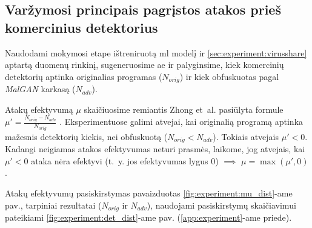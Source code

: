 \clearpage
\subsection{Varžymosi principais pagrįstos atakos prieš komercinius detektorius}

Naudodami mokymosi etape ištreniruotą \acs{ml} modelį ir
\ref{sec:experiment:virusshare} aptartą duomenų rinkinį, sugeneruosime \acs{ae}
ir palyginsime, kiek komercinių detektorių aptinka originalias programas
($N_{orig}$) ir kiek obfuskuotas pagal \textit{MalGAN} karkasą ($N_{adv}$).

Atakų efektyvumą $\mu$ skaičiuosime remiantis Zhong et~al. pasiūlyta formule
$\mu' = \frac{N_{orig} - N_{adv}}{N_{orig}}$
\cite{zhongMalFoxCamouflagedAdversarial2024}. Eksperimentuose galimi atvejai,
kai originalią programą aptinka mažesnis detektorių kiekis, nei obfuskuotą
($N_{orig} < N_{adv}$). Tokiais atvejais $\mu' < 0$. Kadangi neigiamas atakos
efektyvumas neturi prasmės, laikome, jog atvejais, kai $\mu' < 0$ ataka nėra
efektyvi (t.~y. jos efektyvumas lygus $0$) $\implies$ $\mu = \max{(\mu', 0)}$.

Atakų efektyvumų pasiskirstymas pavaizduotas \ref{fig:experiment:mu_dist}-ame
pav., tarpiniai rezultatai ($N_{orig}$ ir $N_{adv}$), naudojami pasiskirstymų
skaičiavimui pateikiami \ref{fig:experiment:det_dist}-ame pav.
(\ref{app:experiment}-ame priede).

